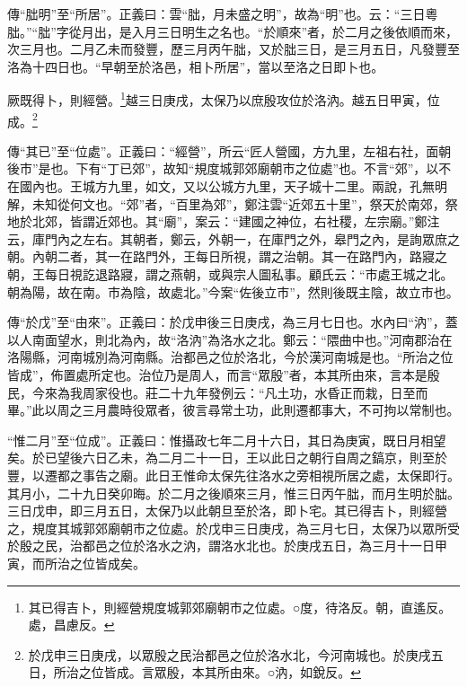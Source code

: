 {\noindent\zhuan{}\fzbyks 傳“朏明”至“所居”。正義曰：雲“朏，月未盛之明”，故為“明”也。云：“三日粵朏。”“朏”字從月出，是入月三日明生之名也。“於順來”者，於二月之後依順而來，次三月也。二月乙未而發豐，歷三月丙午朏，又於朏三日，是三月五日，凡發豐至洛為十四日也。“早朝至於洛邑，相卜所居”，當以至洛之日即卜也。 \par}

厥既得卜，則經營。\footnote{其已得吉卜，則經營規度城郭郊廟朝市之位處。○度，待洛反。朝，直遙反。處，昌慮反。}越三日庚戌，太保乃以庶殷攻位於洛汭。越五日甲寅，位成。\footnote{於戊申三日庚戌，以眾殷之民治都邑之位於洛水北，今河南城也。於庚戌五日，所治之位皆成。言眾殷，本其所由來。○汭，如銳反。}

{\noindent\zhuan{}\fzbyks 傳“其已”至“位處”。正義曰：“經營”，所云“匠人營國，方九里，左祖右社，面朝後市”是也。下有“丁已郊”，故知“規度城郭郊廟朝市之位處”也。不言“郊”，以不在國內也。王城方九里，如文，又以公城方九里，天子城十二里。兩說，孔無明解，未知從何文也。“郊”者，“百里為郊”，鄭注雲“近郊五十里”，祭天於南郊，祭地於北郊，皆謂近郊也。其“廟”，案云：“建國之神位，右社稷，左宗廟。”鄭注云，庫門內之左右。其朝者，鄭云，外朝一，在庫門之外，皋門之內，是詢眾庶之朝。內朝二者，其一在路門外，王每日所視，謂之治朝。其一在路門內，路寢之朝，王每日視訖退路寢，謂之燕朝，或與宗人圖私事。顧氏云：“市處王城之北。朝為陽，故在南。市為陰，故處北。”今案“佐後立市”，然則後既主陰，故立市也。 \par}

{\noindent\zhuan{}\fzbyks 傳“於戊”至“由來”。正義曰：於戊申後三日庚戌，為三月七日也。水內曰“汭”，蓋以人南面望水，則北為內，故“洛汭”為洛水之北。鄭云：“隈曲中也。”河南郡治在洛陽縣，河南城別為河南縣。治都邑之位於洛北，今於漢河南城是也。“所治之位皆成”，佈置處所定也。治位乃是周人，而言“眾殷”者，本其所由來，言本是殷民，今來為我周家役也。莊二十九年發例云：“凡土功，水昏正而栽，日至而畢。”此以周之三月農時役眾者，彼言尋常土功，此則遷都事大，不可拘以常制也。 \par}

{\noindent\shu{}\fzkt “惟二月”至“位成”。正義曰：惟攝政七年二月十六日，其日為庚寅，既日月相望矣。於已望後六日乙未，為二月二十一日，王以此日之朝行自周之鎬京，則至於豐，以遷都之事告之廟。此日王惟命太保先往洛水之旁相視所居之處，太保即行。其月小，二十九日癸卯晦。於二月之後順來三月，惟三日丙午朏，而月生明於朏。三日戊申，即三月五日，太保乃以此朝旦至於洛，即卜宅。其已得吉卜，則經營之，規度其城郭郊廟朝市之位處。於戊申三日庚戌，為三月七日，太保乃以眾所受於殷之民，治都邑之位於洛水之汭，謂洛水北也。於庚戌五日，為三月十一日甲寅，而所治之位皆成矣。 \par}

